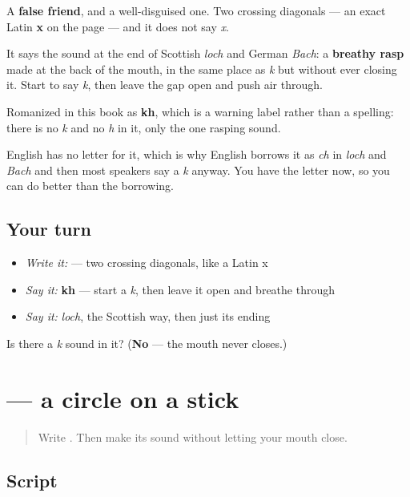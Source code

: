 A \textbf{false friend}, and a well-disguised one. Two crossing diagonals — an exact Latin \textbf{x} on the page — and it does not say \emph{x}.

It says the sound at the end of Scottish \emph{loch} and German \emph{Bach}: a \textbf{breathy rasp} made at the back of the mouth, in the same place as \emph{k} but without ever closing it. Start to say \emph{k}, then leave the gap open and push air through.

Romanized in this book as \textbf{kh}, which is a warning label rather than a spelling: there is no \emph{k} and no \emph{h} in it, only the one rasping sound.

English has no letter for it, which is why English borrows it as \emph{ch} in \emph{loch} and \emph{Bach} and then most speakers say a \emph{k} anyway. You have the letter now, so you can do better than the borrowing.

\subsection*{Your turn}
\begin{itemize}
\raggedright
  \item \emph{Write it:}  — two crossing diagonals, like a Latin x
  \item \emph{Say it:} \textbf{kh} — start a \emph{k}, then leave it open and breathe through
  \item \emph{Say it:} \emph{loch}, the Scottish way, then just its ending
\end{itemize}

\begin{tcolorbox}[breakable,colback=teal!4,colframe=teal!35!black,title={Before you move on}]
Is there a \emph{k} sound in it? (\textbf{No} — the mouth never closes.)
\end{tcolorbox}
\section[\texorpdfstring{\ru{ф} (f)}{ф (f)}]{ — a circle on a stick}

\label{lesson:RU-W07-f}



\begin{quote}
Write . Then make its sound without letting your mouth close.
\end{quote}

\subsection*{Script}

